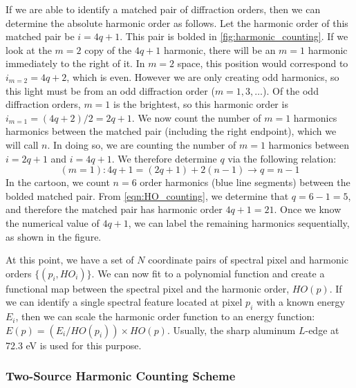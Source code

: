 If we are able to identify a matched pair of diffraction orders, then we can determine the absolute harmonic order as follows. Let the harmonic order of this matched pair be $i = 4q+1$. This pair is bolded in \cref{fig:harmonic_counting}. If we look at the $m=2$ copy of the $4q+1$ harmonic, there will be an $m=1$ harmonic immediately to the right of it. In $m=2$ space, this position would correspond to $i_{m=2} = 4q+2$, which is even. However we are only creating odd harmonics, so this light must be from an odd diffraction order ($m=1, 3, \dots$). Of the odd diffraction orders, $m=1$ is the brightest, so this harmonic order is $i_{m=1} = (4q+2)/2 = 2q+1$. We now count the number of $m=1$ harmonics harmonics between the matched pair (including the right endpoint), which we will call $n$. In doing so, we are counting the number of $m=1$ harmonics between $i=2q+1$ and $i=4q+1$. We therefore determine $q$ via the following relation:
\begin{equation}
(m=1): 4q+1 = (2q+1) + 2(n-1) \rightarrow q = n - 1
\label{eqn:HO_counting}
\end{equation}
In the cartoon, we count $n=6$  order harmonics (blue line segments) between the bolded matched pair. From \cref{eqn:HO_counting}, we determine that $q = 6 - 1 = 5$, and therefore the matched pair has harmonic order $4q+1 = 21$. Once we know the numerical value of $4q+1$, we can label the remaining harmonics sequentially, as shown in the figure.

At this point, we have a set of $N$ coordinate pairs of spectral pixel and harmonic orders $\{(p_i, HO_i)\}$. We can now fit to a polynomial function and create a functional map between the spectral pixel and the harmonic order, $HO(p)$. If we can identify a single spectral feature located at pixel $p_i$ with a known energy $E_i$, then we can scale the harmonic order function to an energy function: $E(p) = (E_i / HO(p_i)) \times HO(p)$. Usually, the sharp aluminum $L$-edge at 72.3 eV is used for this purpose.

\subsubsection{Two-Source Harmonic Counting Scheme}

